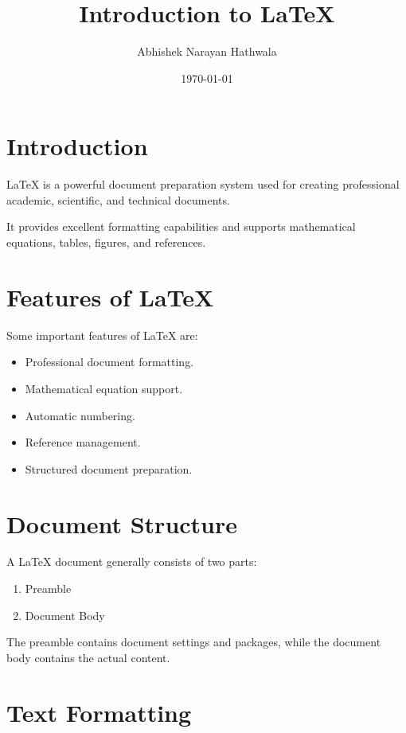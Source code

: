 \documentclass[12pt,a4paper]{article}
\title{\textbf{Introduction to LaTeX}}
\author{Abhishek Narayan Hathwala}
\date{\today}
\begin{document}
\maketitle

\tableofcontents
\newpage

\section{Introduction}

LaTeX is a powerful document preparation system used for
creating professional academic, scientific, and technical documents.

It provides excellent formatting capabilities and supports
mathematical equations, tables, figures, and references.

\section{Features of LaTeX}

Some important features of LaTeX are:

\begin{itemize}
    \item Professional document formatting.
    \item Mathematical equation support.
    \item Automatic numbering.
    \item Reference management.
    \item Structured document preparation.
\end{itemize}

\section{Document Structure}

A LaTeX document generally consists of two parts:

\begin{enumerate}
    \item Preamble
    \item Document Body
\end{enumerate}

The preamble contains document settings and packages,
while the document body contains the actual content.

\section{Text Formatting}
\end{document}
